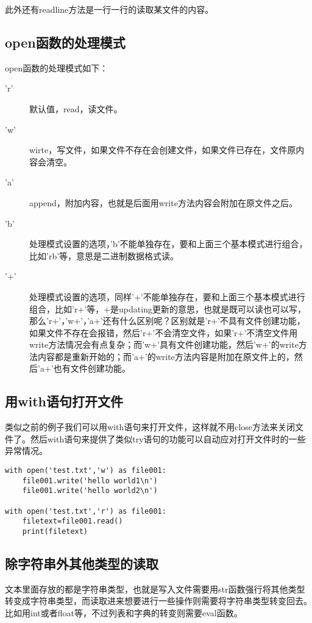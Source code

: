 \documentclass[12pt,oneside]{book}
\begin{document}
\begin{common-format}
此外还有readline方法是一行一行的读取某文件的内容。


\subsection{open函数的处理模式}
open函数的处理模式如下：
\begin{description}
\item['r'] 默认值，read，读文件。
\item['w'] wirte，写文件，如果文件不存在会创建文件，如果文件已存在，文件原内容会清空。
\item['a'] append，附加内容，也就是后面用write方法内容会附加在原文件之后。
\item['b'] 处理模式设置的选项，'b'不能单独存在，要和上面三个基本模式进行组合，比如'rb'等，意思是二进制数据格式读。
\item['+'] 处理模式设置的选项，同样'+'不能单独存在，要和上面三个基本模式进行组合，比如'r+'等，+是updating更新的意思，也就是既可以读也可以写，那么'r+'，'w+'，'a+'还有什么区别呢？区别就是'r+'不具有文件创建功能，如果文件不存在会报错，然后'r+'不会清空文件，如果'r+'不清空文件用write方法情况会有点复杂；而'w+'具有文件创建功能，然后'w+'的write方法内容都是重新开始的；而'a+'的write方法内容是附加在原文件上的，然后'a+'也有文件创建功能。
\end{description}



\subsection{用with语句打开文件}
类似之前的例子我们可以用with语句来打开文件，这样就不用close方法来关闭文件了。然后with语句来提供了类似try语句的功能可以自动应对打开文件时的一些异常情况。
\begin{Verbatim}
with open('test.txt','w') as file001:
    file001.write('hello world1\n')
    file001.write('hello world2\n')

with open('test.txt','r') as file001:
    filetext=file001.read()
    print(filetext)
\end{Verbatim}




\subsection{除字符串外其他类型的读取}
文本里面存放的都是字符串类型，也就是写入文件需要用str函数强行将其他类型转变成字符串类型，而读取进来想要进行一些操作则需要将字符串类型转变回去。比如用int或者float等，不过列表和字典的转变则需要eval函数。


\end{common-format}
\end{document}
